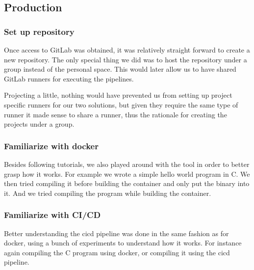
\subsection{Production}





\subsubsection{Set up repository}

Once access to GitLab was obtained, it was relatively straight forward
to create a new repository. The only special thing we did was to host
the repository under a group instead of the personal space. This would
later allow us to have shared GitLab runners for executing the
pipelines.

Projecting a little, nothing would have prevented us from setting up
project specific runners for our two solutions, but given they require
the same type of runner it made sense to share a runner, thus the
rationale for creating the projects under a group.

\subsubsection{Familiarize with docker}

Besides following tutorials, we also played around with the tool in
order to better grasp how it works. For example we wrote a simple
hello world program in C. We then tried compiling it before building
the container and only put the binary into it. And we tried compiling
the program while building the container.

\subsubsection{Familiarize with CI/CD}

Better understanding the \gls{cicd} pipeline was done in the same
fashion as for docker, using a bunch of experiments to understand how
it works. For instance again compiling the C program using docker, or
compiling it using the \gls{cicd} pipeline.

